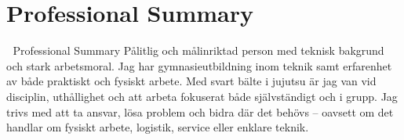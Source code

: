 \section{Professional Summary}
🧰 Professional Summary
Pålitlig och målinriktad person med teknisk bakgrund och stark arbetsmoral. Jag har gymnasieutbildning inom teknik samt erfarenhet av både praktiskt och fysiskt arbete. Med svart bälte i jujutsu är jag van vid disciplin, uthållighet och att arbeta fokuserat både självständigt och i grupp. Jag trivs med att ta ansvar, lösa problem och bidra där det behövs – oavsett om det handlar om fysiskt arbete, logistik, service eller enklare teknik.

